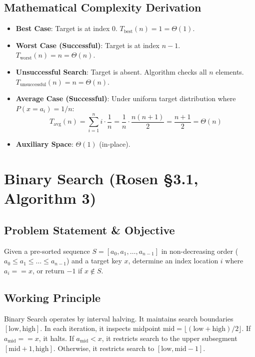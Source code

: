 \documentclass[11pt,a4paper,oneside]{report}
\theoremstyle{definition}
\begin{document}
\subsection{Mathematical Complexity Derivation}
\begin{itemize}
    \item \textbf{Best Case}: Target is at index $0$. $T_{\text{best}}(n) = 1 = \Theta(1)$.
    \item \textbf{Worst Case (Successful)}: Target is at index $n - 1$. $T_{\text{worst}}(n) = n = \Theta(n)$.
    \item \textbf{Unsuccessful Search}: Target is absent. Algorithm checks all $n$ elements. $T_{\text{unsuccessful}}(n) = n = \Theta(n)$.
    \item \textbf{Average Case (Successful)}: Under uniform target distribution where $P(x = a_i) = 1/n$:
    $$T_{\text{avg}}(n) = \sum_{i=1}^n i \cdot \frac{1}{n} = \frac{1}{n} \cdot \frac{n(n + 1)}{2} = \frac{n + 1}{2} = \Theta(n)$$
    \item \textbf{Auxiliary Space}: $\Theta(1)$ (in-place).
\end{itemize}

\section{Binary Search (Rosen §3.1, Algorithm 3)}
\label{sec:binary_search}

\subsection{Problem Statement \& Objective}
Given a pre-sorted sequence $S = [a_0, a_1, \dots, a_{n-1}]$ in non-decreasing order ($a_0 \le a_1 \le \dots \le a_{n-1}$) and a target key $x$, determine an index location $i$ where $a_i == x$, or return $-1$ if $x \notin S$.

\subsection{Working Principle}
Binary Search operates by interval halving. It maintains search boundaries $[\text{low}, \text{high}]$. In each iteration, it inspects midpoint $\text{mid} = \lfloor (\text{low} + \text{high}) / 2 \rfloor$. If $a_{\text{mid}} == x$, it halts. If $a_{\text{mid}} < x$, it restricts search to the upper subsegment $[\text{mid} + 1, \text{high}]$. Otherwise, it restricts search to $[\text{low}, \text{mid} - 1]$.
\end{document}
